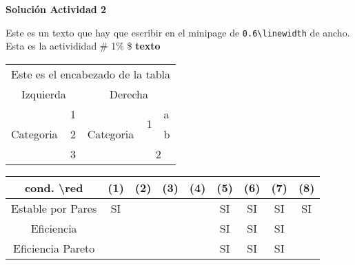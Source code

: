 \documentclass[11pt]{article}
\begin{document}
\begin{center}\textbf{Solución Actividad 2}\end{center}
\listoftables

\begin{minipage}{0.6\linewidth}
Este es un texto que hay que escribir en el minipage de \verb!0.6\linewidth! de ancho.
Esta es la activididad \# 1\% \$ \textbf{texto}
\end{minipage}
\begin{minipage}{0.4\linewidth}
    \begin{tabular}{*5{l}}\toprule
             \multicolumn{5}{c}{Este es el encabezado de la tabla}\\
             \multicolumn{2}{c}{Izquierda} &
             \multicolumn{3}{c}{Derecha}\\\midrule
             \multirow{3}{*}{Categoria} & 1 &
             \multirow{3}{*}{Categoria} &
             \multirow{2}{*}{1} & a \\\cmidrule{5-5}
             & 2 & & & b \\\cmidrule{4-5}
             & 3 & & \multicolumn{2}{c}{2}\\ \bottomrule 
        \end{tabular}
\end{minipage}

\begin{minipage}{5cm}
\end{minipage}
\begin{minipage}{12cm}
\begin{tabular}{|*9{c|}}\hline
    cond. \textbackslash red & (1) & (2) & (3) & (4) & (5) & (6) & (7) & (8)\\ \hline
         Estable por Pares & SI & & & & SI & SI & SI & SI\\ \hline
         Eficiencia & & & & & SI & SI & SI & \\ \hline
         Eficiencia Pareto & & & & & SI & SI & SI & \\ \hline
    \end{tabular}
\end{minipage}
\end{document}
